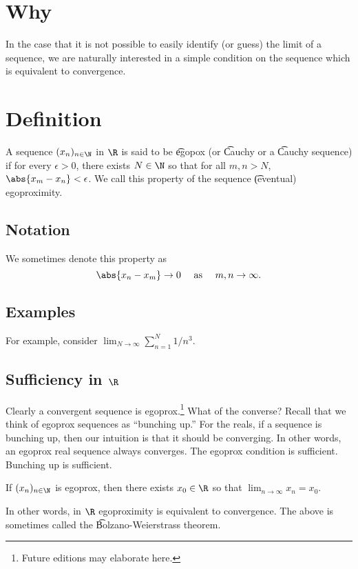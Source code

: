 
\section*{Why}

In the case that it is not possible to easily identify (or guess) the limit of a sequence, we are naturally interested in a simple condition on the sequence which is equivalent to convergence.

\section*{Definition}

A sequence $(x_n)_{n \in \N  }$ in $\R $ is said to be \t{egopox} (or \t{Cauchy} or a \t{Cauchy sequence}) if for every $\epsilon  > 0$, there exists $N \in \N  $ so that for all $m, n > N$, $\abs{x_m - x_n} < \epsilon $.
We call this property of the sequence \t{(eventual) egoproximity}.

\subsection*{Notation}

We sometimes denote this property as
\[
\abs{x_n - x_m} \to 0 \quad \text{ as } \quad m, n \to \infty.
\]

\subsection*{Examples}

For example, consider $\lim_{N \to \infty} \sum_{n = 1}^{N} 1/n^3$.

\subsection*{Sufficiency in $\R $}

Clearly a convergent sequence is egoprox.\footnote{Future editions may elaborate here.}
What of the converse?
Recall that we think of egoprox sequences as ``bunching up.''
For the reals, if a sequence is bunching up, then our intuition is that it should be converging.
In other words, an egoprox real sequence always converges.
The egoprox condition is sufficient.
Bunching up is sufficient.

\begin{proposition}
If $(x_n)_{n \in \N  }$ is egoprox, then there exists $x_0 \in \R $ so that $\lim_{n \to \infty} x_n = x_0$.
\end{proposition}

In other words, in $\R $ egoproximity is equivalent to convergence.
The above is sometimes called the \t{Bolzano-Weierstrass theorem}.

\blankpage